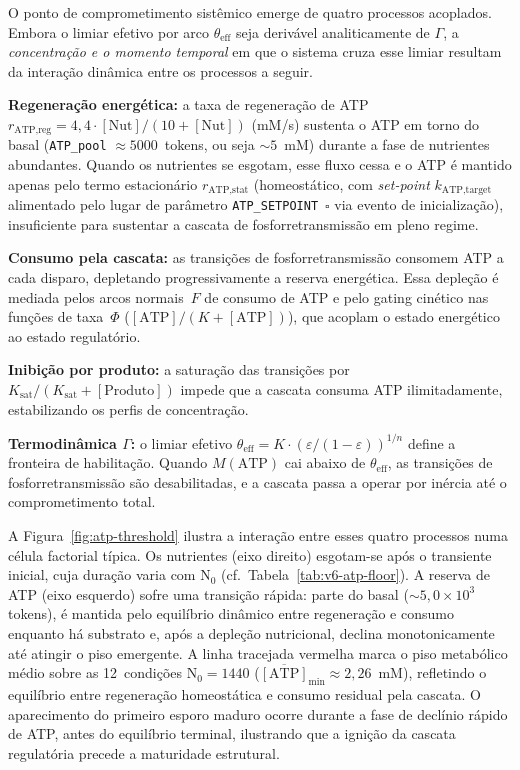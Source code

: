 O ponto de comprometimento sistêmico emerge de quatro processos acoplados.
Embora o limiar efetivo por arco $\theta_{\text{eff}}$ seja derivável
analiticamente de $\Gamma$, a \emph{concentração e o momento temporal} em que
o sistema cruza esse limiar resultam da interação dinâmica entre os processos
a seguir.

\textbf{Regeneração energética:} a taxa de regeneração de ATP
$r_{\text{ATP,reg}} = 4{,}4 \cdot [\text{Nut}] / (10 + [\text{Nut}])$
(mM/s) sustenta o ATP em torno do basal
(\texttt{ATP\_pool} $\approx 5000$~tokens, ou seja $\sim\!5$~mM)
durante a fase de nutrientes abundantes.
Quando os nutrientes se esgotam, esse fluxo cessa e o ATP é
mantido apenas pelo termo estacionário $r_{\text{ATP,stat}}$
(homeostático, com \emph{set-point} $k_{\text{ATP,target}}$ alimentado
pelo lugar de parâmetro \texttt{ATP\_SETPOINT}~$\square$ via evento
de inicialização), insuficiente para sustentar a cascata de
fosforretransmissão em pleno regime.

\textbf{Consumo pela cascata:} as transições de fosforretransmissão
consomem ATP a cada disparo, depletando progressivamente a reserva energética.
Essa depleção é mediada pelos arcos normais~$F$ de consumo de ATP e pelo
gating cinético nas funções de taxa~$\Phi$ ($[\text{ATP}]/(K + [\text{ATP}])$),
que acoplam o estado energético ao estado regulatório.

\textbf{Inibição por produto:} a saturação das transições por
$K_{\text{sat}} / (K_{\text{sat}} + [\text{Produto}])$ impede que a
cascata consuma ATP ilimitadamente, estabilizando os perfis de concentração.

\textbf{Termodinâmica $\Gamma$:} o limiar efetivo
$\theta_{\text{eff}} = K \cdot (\varepsilon / (1 - \varepsilon))^{1/n}$
define a fronteira de habilitação.
Quando $M(\text{ATP})$ cai abaixo de $\theta_{\text{eff}}$, as transições
de fosforretransmissão são desabilitadas, e a cascata passa a operar por
inércia até o comprometimento total.

A Figura~\ref{fig:atp-threshold} ilustra a interação entre esses quatro
processos numa célula factorial típica.
Os nutrientes (eixo direito) esgotam-se após o transiente inicial,
cuja duração varia com $\text{N}_0$ (cf.\ Tabela~\ref{tab:v6-atp-floor}).
A reserva de ATP (eixo esquerdo) sofre uma transição rápida: parte do
basal ($\sim\!5{,}0\!\times\!10^3$ tokens), é mantida pelo equilíbrio
dinâmico entre regeneração e consumo enquanto há substrato e, após a
depleção nutricional, declina monotonicamente até atingir o piso
emergente.
A linha tracejada vermelha marca o piso metabólico médio sobre as
12~condições $\text{N}_0=1440$ ($\overline{[\text{ATP}]}_{\min} \approx 2{,}26$~mM),
refletindo o equilíbrio entre regeneração homeostática e consumo
residual pela cascata.
O aparecimento do primeiro esporo maduro ocorre durante a fase de
declínio rápido de ATP, antes do equilíbrio terminal, ilustrando que
a ignição da cascata regulatória precede a maturidade estrutural.


